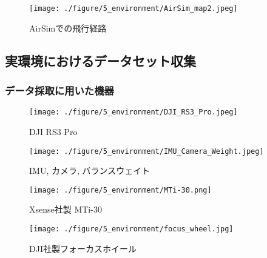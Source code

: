 \begin{figure}[thpb]
  \begin{minipage}[htpb]{1.0\hsize}
  \begin{center}
  \texttt{[image: ./figure/5\_environment/AirSim\_map2.jpeg]}
  \caption{AirSimでの飛行経路}
  \label{fig:AirSim_map}
  \end{center}
  \end{minipage}
\end{figure}


\subsection{実環境におけるデータセット収集}\label{sec:real_world_dataset_collection}

\subsubsection{データ採取に用いた機器}

\begin{figure}[thpb]
  \begin{minipage}[htpb]{0.5\hsize}
  \begin{center}
  \texttt{[image: ./figure/5\_environment/DJI\_RS3\_Pro.jpeg]}
  \caption{DJI RS3 Pro}
  \label{fig:DJI_RS3_Pro}
  \end{center}
  \end{minipage}
  \begin{minipage}[htpb]{0.5\hsize}
  \begin{center}
  \texttt{[image: ./figure/5\_environment/IMU\_Camera\_Weight.jpeg]}
  \caption{IMU, カメラ, バランスウェイト}
  \label{fig:Equip}
  \end{center}
  \end{minipage}
\end{figure}

\begin{figure}[thpb]
  \begin{minipage}[htpb]{0.5\hsize}
  \begin{center}
  \texttt{[image: ./figure/5\_environment/MTi-30.png]}
  \caption{Xsense社製 MTi-30}
  \label{fig:MTi-30}
  \end{center}
  \end{minipage}
  \begin{minipage}[htpb]{0.5\hsize}
  \begin{center}
  \texttt{[image: ./figure/5\_environment/focus\_wheel.jpg]}
  \caption{DJI社製フォーカスホイール}
  \label{fig:focus_wheel}
  \end{center}
  \end{minipage}
\end{figure}

